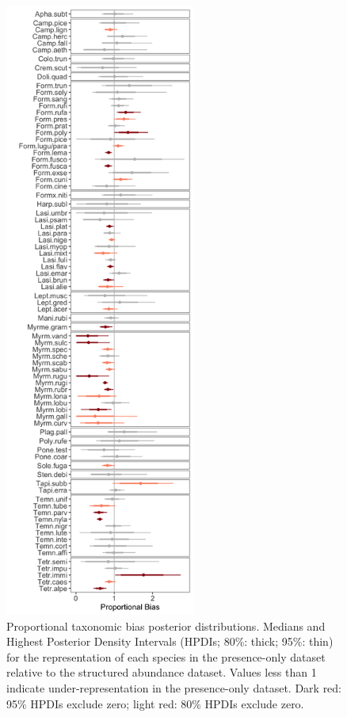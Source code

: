 \documentclass[preprint,review,times,12pt]{elsarticle}
\begin{document}
\begin{figure}
	\centering\includegraphics[height=8in]{ms/1_Ecography/1/figs/D_opt.png}
	\caption{\label{fig:D} Proportional taxonomic bias posterior distributions. Medians and Highest Posterior Density Intervals (HPDIs; 80\%: thick; 95\%: thin) for the representation of each species in the presence-only dataset relative to the structured abundance dataset. Values less than 1 indicate under-representation in the presence-only dataset. Dark red: 95\% HPDIs exclude zero; light red: 80\% HPDIs exclude zero. }
\end{figure}
\end{document}
